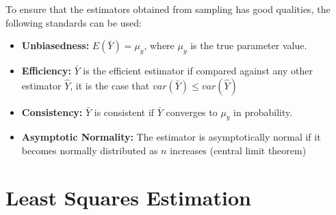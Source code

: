 \documentclass[12pt]{article}
\theoremstyle{definition}
\theoremstyle{property}
\theoremstyle{assumption}
\theoremstyle{example}
\theoremstyle{comment}
\begin{document}

To ensure that the estimators obtained from sampling has good qualities, the following standards can be used:
\begin{itemize}
\item \textbf{Unbiasedness:} $E(\bar{Y})=\mu_y$, where $\mu_y$ is the true parameter value.
\item \textbf{Efficiency:} $\bar{Y}$ is the efficient estimator if compared against any other estimator $\hat{Y}$, it is the case that $var(\bar{Y})\leq var(\hat{Y})$
\item \textbf{Consistency:} $\bar{Y}$ is consistent if $\bar{Y}$ converges to $\mu_y$ in probability.
\item \textbf{Asymptotic Normality:} The estimator is asymptotically normal if it becomes normally distributed as $n$ increases (central limit theorem) 
\end{itemize}



\section{Least Squares Estimation}
\end{document}
